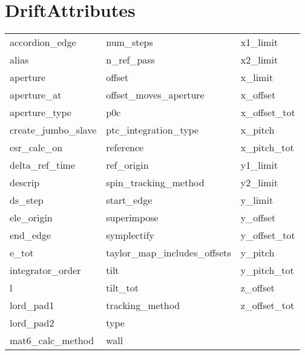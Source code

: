  \section{DriftAttributes}
 \label{s:list.drift}
 
 \begin{tabular}{lll} \toprule
accordion_edge              & num_steps                   & x1_limit                    \\
alias                       & n_ref_pass                  & x2_limit                    \\
aperture                    & offset                      & x_limit                     \\
aperture_at                 & offset_moves_aperture       & x_offset                    \\
aperture_type               & p0c                         & x_offset_tot                \\
create_jumbo_slave          & ptc_integration_type        & x_pitch                     \\
csr_calc_on                 & reference                   & x_pitch_tot                 \\
delta_ref_time              & ref_origin                  & y1_limit                    \\
descrip                     & spin_tracking_method        & y2_limit                    \\
ds_step                     & start_edge                  & y_limit                     \\
ele_origin                  & superimpose                 & y_offset                    \\
end_edge                    & symplectify                 & y_offset_tot                \\
e_tot                       & taylor_map_includes_offsets & y_pitch                     \\
integrator_order            & tilt                        & y_pitch_tot                 \\
l                           & tilt_tot                    & z_offset                    \\
lord_pad1                   & tracking_method             & z_offset_tot                \\
lord_pad2                   & type                        &                             \\
mat6_calc_method            & wall                        &                             \\
 \bottomrule
 \end{tabular}
 \vfill
 
